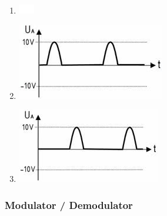 \documentclass[8pt]{article}
\begin{document}
\begin{enumerate}
\begin{enumerate}[nolistsep,label=\Alph*]
\begin{enumerate}[nolistsep,label=\Alph*]
\item
\begin{center}
	\begin{minipage}{\linewidth}
		\centering
		\includegraphics[scale=1.0]{pics/td432_d.jpg}
	\end{minipage}
\end{center}
\item
\begin{center}
	\begin{minipage}{\linewidth}
		\centering
		\includegraphics[scale=1.0]{pics/td432_e.jpg}
	\end{minipage}
\end{center}
\item
\begin{center}
	\begin{minipage}{\linewidth}
		\centering
		\includegraphics[scale=1.0]{pics/td432_f.jpg}
	\end{minipage}
\end{center}
\end{enumerate}

\pagebreak
\subsubsection{Modulator / Demodulator}

\end{enumerate}
\end{enumerate}
\end{document}
